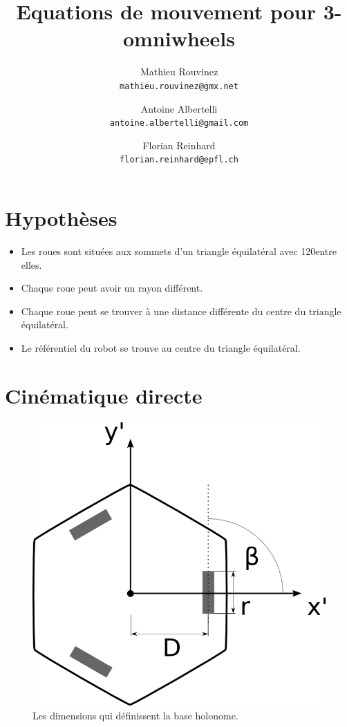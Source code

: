 \documentclass[a4paper]{paper}
\author{
Mathieu Rouvinez \\
\texttt{mathieu.rouvinez@gmx.net}
\and
Antoine Albertelli \\
\texttt{antoine.albertelli@gmail.com}
\and
Florian Reinhard \\
\texttt{florian.reinhard@epfl.ch}
}
\title{Equations de mouvement pour 3-omniwheels}
\begin{document}
\maketitle
\section{Hypothèses}
\begin{itemize}
    \item Les roues sont situées aux sommets d'un triangle équilatéral avec 120\degre entre elles.
    \item Chaque roue peut avoir un rayon différent.
    \item Chaque roue peut se trouver à une distance différente du centre du triangle équilatéral.
    \item Le référentiel du robot se trouve au centre du triangle équilatéral.
\end{itemize}

\section{Cinématique directe}

\begin{figure}[h]
    \centering
    \includegraphics{holonomic_base.png}
    \caption{Les dimensions qui définissent la base holonome.}
    \label{fig:holonomic_base}
\end{figure}
\end{document}
